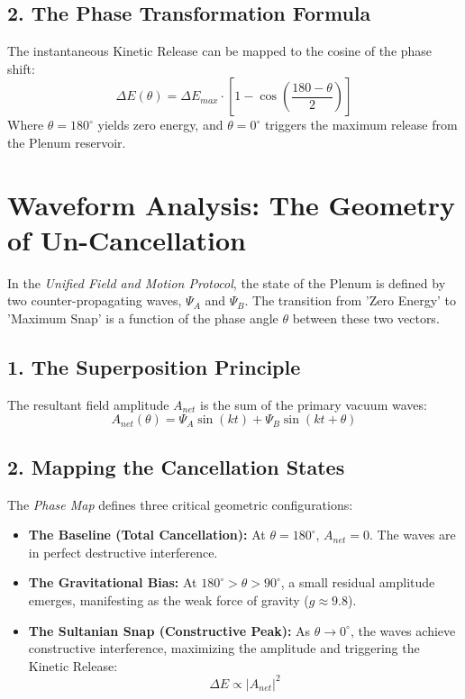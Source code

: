 \documentclass[11pt]{article}
\begin{document}
\subsection*{2. The Phase Transformation Formula}
The instantaneous Kinetic Release can be mapped to the cosine of the phase shift:
\begin{equation}
    \Delta E(\theta) = \Delta E_{max} \cdot \left[ 1 - \cos\left(\frac{180 - \theta}{2}\right) \right]
\end{equation}
Where $\theta = 180^\circ$ yields zero energy, and $\theta = 0^\circ$ triggers the maximum release from the Plenum reservoir.


\section*{Waveform Analysis: The Geometry of Un-Cancellation}

In the \textit{Unified Field and Motion Protocol}, the state of the Plenum is defined by two counter-propagating waves, $\Psi_A$ and $\Psi_B$. The transition from 'Zero Energy' to 'Maximum Snap' is a function of the phase angle $\theta$ between these two vectors.

\subsection*{1. The Superposition Principle}
The resultant field amplitude $A_{net}$ is the sum of the primary vacuum waves:
\begin{equation}
    A_{net}(\theta) = \Psi_A \sin(kt) + \Psi_B \sin(kt + \theta)
\end{equation}

\subsection*{2. Mapping the Cancellation States}
The \textit{Phase Map} defines three critical geometric configurations:
\begin{itemize}
    \item \textbf{The Baseline (Total Cancellation):} At $\theta = 180^\circ$, $A_{net} = 0$. The waves are in perfect destructive interference.
    \item \textbf{The Gravitational Bias:} At $180^\circ > \theta > 90^\circ$, a small residual amplitude emerges, manifesting as the weak force of gravity ($g \approx 9.8$).
    \item \textbf{The Sultanian Snap (Constructive Peak):} As $\theta \to 0^\circ$, the waves achieve constructive interference, maximizing the amplitude and triggering the Kinetic Release:
    \begin{equation}
        \Delta E \propto |A_{net}|^2
    \end{equation}
\end{itemize}
\end{document}

